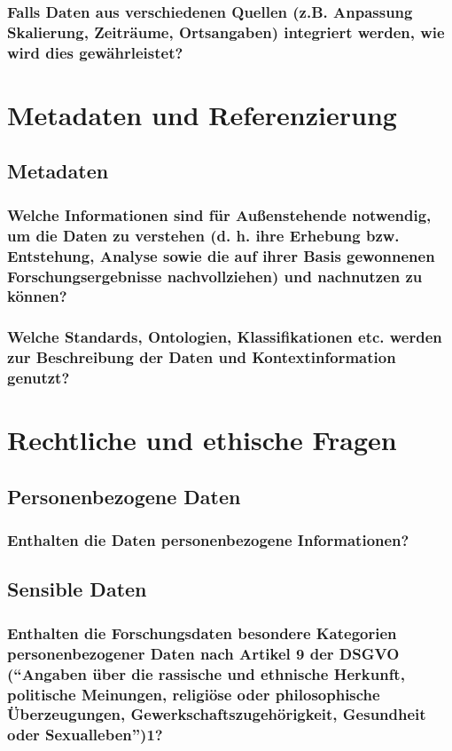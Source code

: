 \subsubsection*{Falls Daten aus verschiedenen Quellen (z.B. Anpassung Skalierung, Zeiträume, Ortsangaben) integriert werden, wie wird dies gewährleistet?}

\section{Metadaten und Referenzierung}
\subsection*{Metadaten}
\subsubsection*{Welche Informationen sind für Außenstehende notwendig, um die Daten zu verstehen (d. h. ihre Erhebung bzw. Entstehung, Analyse sowie die auf ihrer Basis gewonnenen Forschungsergebnisse nachvollziehen) und nachnutzen zu können?}
\subsubsection*{Welche Standards, Ontologien, Klassifikationen etc. werden zur Beschreibung der Daten und Kontextinformation genutzt?}

\section{Rechtliche und ethische Fragen}
\subsection*{Personenbezogene Daten}
\subsubsection*{Enthalten die Daten personenbezogene Informationen?}
\subsection*{Sensible Daten}
\subsubsection*{Enthalten die Forschungsdaten besondere Kategorien personenbezogener Daten nach Artikel 9 der DSGVO (“Angaben über die rassische und ethnische Herkunft, politische Meinungen, religiöse oder philosophische Überzeugungen, Gewerkschaftszugehörigkeit, Gesundheit oder Sexualleben”)1?}
